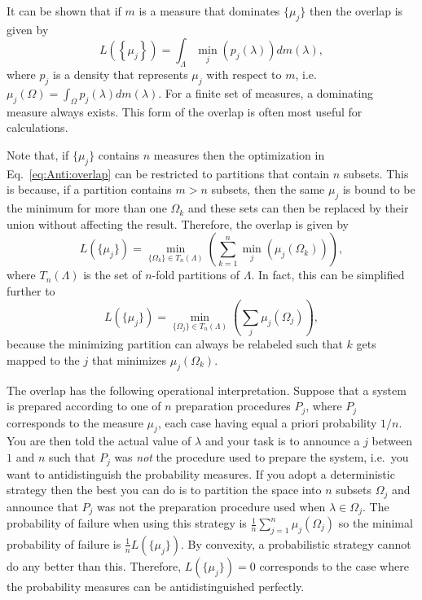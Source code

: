 \documentclass[DIV=calc,fontsize=12pt]{scrartcl} %
\theoremstyle{definition}
\theoremstyle{plain}
\begin{document}
It can be shown that if $m$ is a measure that dominates $\{\mu_j\}$
then the overlap is given by
\begin{equation}
\label{eq:Anti:domform}
L \left ( \left \{ \mu_j \right \}\right ) = \int_{\Lambda} \min_j
\left (p_j(\lambda) \right ) dm(\lambda),
\end{equation}
where $p_j$ is a density that represents $\mu_j$ with respect to $m$,
i.e. $\mu_j(\Omega) = \int_{\Omega} p_j(\lambda)dm(\lambda)$.  For a
finite set of measures, a dominating measure always exists.  This form
of the overlap is often most useful for calculations.

Note that, if $\{\mu_j\}$ contains $n$ measures then the optimization
in Eq.~\eqref{eq:Anti:overlap} can be restricted to partitions that
contain $n$ subsets.  This is because, if a partition contains $m > n$
subsets, then the same $\mu_j$ is bound to be the minimum for more
than one $\Omega_k$ and these sets can then be replaced by their union
without affecting the result.  Therefore, the overlap is given by
\begin{equation}
L(\{\mu_j\}) = \min_{\{\Omega_k\} \in T_n(\Lambda)} \left ( \sum_{k=1}^n
\min_j \left ( \mu_j(\Omega_k) \right ) \right ),
\end{equation}
where $T_n(\Lambda)$ is the set of $n$-fold partitions of $\Lambda$.
In fact, this can be simplified further to
\begin{equation}
\label{eq:Anti:npart}
L(\{\mu_j\}) = \min_{\{\Omega_j\} \in T_n(\Lambda)} \left ( \sum_j
\mu_j(\Omega_j) \right ),
\end{equation}
because the minimizing partition can always be relabeled such that
$k$ gets mapped to the $j$ that minimizes $\mu_j(\Omega_k)$.

The overlap has the following operational interpretation.  Suppose
that a system is prepared according to one of $n$ preparation
procedures $P_j$, where $P_j$ corresponds to the measure $\mu_j$, each
case having equal a priori probability $1/n$.  You are then told the
actual value of $\lambda$ and your task is to announce a $j$ between
$1$ and $n$ such that $P_j$ was \emph{not} the procedure used to
prepare the system, i.e.\ you want to antidistinguish the probability
measures.  If you adopt a deterministic strategy then the best you can
do is to partition the space into $n$ subsets $\Omega_j$ and announce
that $P_j$ was not the preparation procedure used when $\lambda \in
\Omega_j$.  The probability of failure when using this strategy is
$\frac{1}{n} \sum_{j=1}^n \mu_j(\Omega_j)$ so the minimal probability
of failure is $\frac{1}{n} L(\{\mu_j\})$.  By convexity, a
probabilistic strategy cannot do any better than this.  Therefore,
$L(\{\mu_j\}) = 0$ corresponds to the case where the probability
measures can be antidistinguished perfectly.
\end{document}
